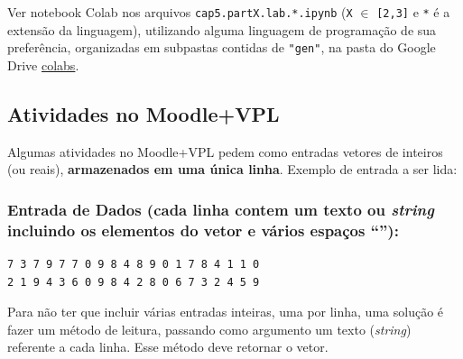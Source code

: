 \documentclass[12pt,a4paper]{article}
\begin{document}
    Ver notebook Colab nos arquivos \texttt{cap5.partX.lab.*.ipynb}
(\texttt{X} \(\in\) \texttt{{[}2,3{]}} e \texttt{*} é a extensão da
linguagem), utilizando alguma linguagem de programação de sua
preferência, organizadas em subpastas contidas de \texttt{"gen"}, na
pasta do Google Drive
\href{https://drive.google.com/drive/folders/1YlFwv8XYN7PYYf-HwDMlkxzbmXzJw9cM?usp=sharing}{colabs}.

    \hypertarget{atividades-no-moodlevpl}{%
\subsection{Atividades no Moodle+VPL}\label{atividades-no-moodlevpl}}

Algumas atividades no Moodle+VPL pedem como entradas vetores de inteiros
(ou reais), \textbf{armazenados em uma única linha}. Exemplo de entrada
a ser lida:

\hypertarget{entrada-de-dados-cada-linha-contem-um-texto-ou-string-incluindo-os-elementos-do-vetor-e-vuxe1rios-espauxe7os}{%
\subsubsection{\texorpdfstring{Entrada de Dados (cada linha contem um
texto ou \emph{string} incluindo os elementos do vetor e vários espaços
``\texttt{}''):}{Entrada de Dados (cada linha contem um texto ou string incluindo os elementos do vetor e vários espaços ``\,''):}}\label{entrada-de-dados-cada-linha-contem-um-texto-ou-string-incluindo-os-elementos-do-vetor-e-vuxe1rios-espauxe7os}}

\begin{verbatim}
7 3 7 9 7 7 0 9 8 4 8 9 0 1 7 8 4 1 1 0 
2 1 9 4 3 6 0 9 8 4 2 8 0 6 7 3 2 4 5 9
\end{verbatim}

Para não ter que incluir várias entradas inteiras, uma por linha, uma
solução é fazer um método de leitura, passando como argumento um texto
(\emph{string}) referente a cada linha. Esse método deve retornar o
vetor.
\end{document}
